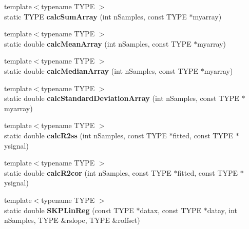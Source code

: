 \begin{DoxyCompactItemize}
\item 
\hypertarget{class_k_w_util_abe27306f912197863466e7c68d3c66fb}{{\footnotesize template$<$typename T\-Y\-P\-E $>$ }\\static T\-Y\-P\-E {\bfseries calc\-Sum\-Array} (int n\-Samples, const T\-Y\-P\-E $\ast$myarray)}\label{class_k_w_util_abe27306f912197863466e7c68d3c66fb}

\item 
\hypertarget{class_k_w_util_ad9cb19db7d541d5ca5a60c6a28b922e1}{{\footnotesize template$<$typename T\-Y\-P\-E $>$ }\\static double {\bfseries calc\-Mean\-Array} (int n\-Samples, const T\-Y\-P\-E $\ast$myarray)}\label{class_k_w_util_ad9cb19db7d541d5ca5a60c6a28b922e1}

\item 
\hypertarget{class_k_w_util_a6c10285ae2d87ccda6ddaa18c81dea39}{{\footnotesize template$<$typename T\-Y\-P\-E $>$ }\\static double {\bfseries calc\-Median\-Array} (int n\-Samples, const T\-Y\-P\-E $\ast$myarray)}\label{class_k_w_util_a6c10285ae2d87ccda6ddaa18c81dea39}

\item 
\hypertarget{class_k_w_util_ad9d38c641f6b227be4418acf404170d4}{{\footnotesize template$<$typename T\-Y\-P\-E $>$ }\\static double {\bfseries calc\-Standard\-Deviation\-Array} (int n\-Samples, const T\-Y\-P\-E $\ast$myarray)}\label{class_k_w_util_ad9d38c641f6b227be4418acf404170d4}

\item 
\hypertarget{class_k_w_util_ae26dd38b1c5c823fa37129520bb4cc47}{{\footnotesize template$<$typename T\-Y\-P\-E $>$ }\\static double {\bfseries calc\-R2ss} (int n\-Samples, const T\-Y\-P\-E $\ast$fitted, const T\-Y\-P\-E $\ast$ysignal)}\label{class_k_w_util_ae26dd38b1c5c823fa37129520bb4cc47}

\item 
\hypertarget{class_k_w_util_a9eecfdafa3ae5e493830181fa7ea8fa3}{{\footnotesize template$<$typename T\-Y\-P\-E $>$ }\\static double {\bfseries calc\-R2cor} (int n\-Samples, const T\-Y\-P\-E $\ast$fitted, const T\-Y\-P\-E $\ast$ysignal)}\label{class_k_w_util_a9eecfdafa3ae5e493830181fa7ea8fa3}

\item 
\hypertarget{class_k_w_util_ac7633e5346a8b4ad6b2d1d960eb22fc9}{{\footnotesize template$<$typename T\-Y\-P\-E $>$ }\\static double {\bfseries S\-K\-P\-Lin\-Reg} (const T\-Y\-P\-E $\ast$datax, const T\-Y\-P\-E $\ast$datay, int n\-Samples, T\-Y\-P\-E \&rslope, T\-Y\-P\-E \&roffset)}\label{class_k_w_util_ac7633e5346a8b4ad6b2d1d960eb22fc9}


\end{DoxyCompactItemize}
